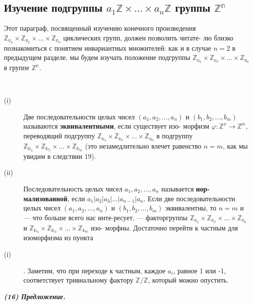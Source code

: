 \documentclass{mai_book}
\begin{document}
\subsection{Изучение подгруппы $a_1\mathbb{Z} \times ... \times a_n\mathbb{Z}$ группы $\mathbb{Z^n}$}
\noindent Этот параграф, посвященный изучению конечного произведения \linebreak $\mathbb{Z_{a_1}} \times \mathbb{Z_{a_2}} \times ... \times \mathbb{Z_{a_n}}$ циклических групп, должен позволить читате- \linebreak лю близко познакомиться с понятием инвариантных множителей: как \linebreak и в случае $n = 2$ в предыдущем разделе, мы будем изучать положение подгруппы $\mathbb{Z_{a_1}} \times \mathbb{Z_{a_2}} \times ... \times \mathbb{Z_{a_n}}$ в группе $\mathbb{Z^n}$.

\begin{determ}
\
 \begin{description} \item[(i)]  Две последовательности целых чисел $(a_1, a_2, ..., a_n)$ и \linebreak $(b_1, b_2, ..., b_m)$ называются \textbf{эквивалентными}, если существует изо- \linebreak морфизм $\varphi : \mathbb{Z^n} \to \mathbb{Z^m}$, переводящий подгруппу $\mathbb{Z_{a_1}} \times \mathbb{Z_{a_2}} \times ... \times \mathbb{Z_{a_n}}$ в \linebreak подгруппу $\mathbb{Z_{b_1}} \times \mathbb{Z_{b_2}} \times ... \times \mathbb{Z_{b_m}}$ (это незамедлительно влечет равенство \linebreak $n = m$, как мы увидим в следствии 19).  
\item[(ii)] Последовательность целых чисел $a_1, a_2, ..., a_n$ называется \textbf{нор-} \linebreak \textbf{мализованной}, если $a_1 | a_2 | a_3 | ... | a_{n-1} | a_n$.   
Если две последовательности целых чисел $(a_1, a_2, ..., a_n)$ и \linebreak $(b_1, b_2, ..., b_m)$ эквивалентны, то $n = m$ и --- что больше всего нас инте-\linebreak ресует, --- факторгруппы $\mathbb{Z_{a_1}} \times \mathbb{Z_{a_2}} \times ... \times \mathbb{Z_{a_n}}$ и $\mathbb{Z_{b_1}} \times \mathbb{Z_{b_2}} \times ... \times \mathbb{Z_{b_m}}$ изо- \linebreak морфны. Достаточно перейти к частным для изоморфизма из пункта \linebreak \item[(i)] . Заметим, что при переходе к частным, каждое $a_i$, равное 1 или -1, \linebreak соответствует тривиальному фактору $\mathbb{Z} / \mathbb{Z}$, который можно опустить.

\end{description} 
\end{determ}
\emph{\textbf{(16) Предложение.}}
\end{document}
